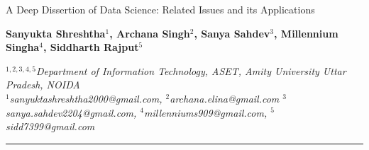 \documentclass[a4paper]{article}
\begin{document}
\newpage

\begin{center}
{\fontsize{24pt}{28.8pt}\selectfont A Deep Dissertion of Data Science: Related
Issues and its Applications}
 
\end{center}

\begin{center}
\textbf{Sanyukta Shreshtha$^{1}$, Archana Singh$^{2}$, Sanya Sahdev$^{3}$, Millennium Singha$^{4}$, Siddharth Rajput$^{5}$}
\end{center}

	\begin{center}
	\textit{$^{1,2,3,4,5}$Department of Information Technology, ASET, Amity University Uttar Pradesh, NOIDA\\
	$^{1}$sanyuktashreshtha2000@gmail.com, $^{2}				$archana.elina@gmail.com
	$^{3}$sanya.sahdev2204@gmail.com, $^{4}					$millenniums909@gmail.com, $^{5}$sidd7399@gmail.com}
\end{center}
\hrule
\vspace{10pt}
\end{document}
